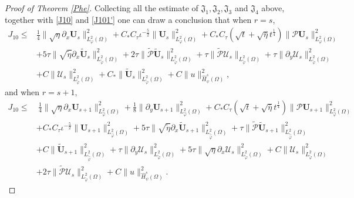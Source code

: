 \documentclass[10pt,a4paper]{amsart}
\begin{document}
\begin{proof}[Proof of Theorem \ref{Phe}]
Collecting all the estimate of $\mathfrak{J}_{1}, \mathfrak{J}_{2}, \mathfrak{J}_{3}$ and $\mathfrak{J}_{4}$ above, together with \eqref{J10} and \eqref{J101'} one can draw a conclusion that when $r=s$,
\begin{align*}
J_{10}
\leq& \frac{1}{4}\|\sqrt{\eta}\partial_{x}\mathbf{U}_{s}\|_{L_{\varphi}^{2}(\Omega)}^{2}
     +C_{*}C_{\tau}\iota^{-\frac{5}{2}}\|\mathbf{U}_{s}\|_{L_{\varphi}^{2}(\Omega)}^{2}
     +C_{*}C_{\tau}(\sqrt{t}+\sqrt{\bar{\eta}}t^{\frac{1}{4}})\|\mathcal{P}\mathbf{U}_{s}\|_{L_{\varphi}^{2}(\Omega)}^{2}\\
    &+5\tau\|\sqrt{\tilde{\eta}}\partial_{x}\tilde{\mathbf{U}}_{s}\|_{L_{\tilde{\varphi}}^{2}(\Omega)}^{2}
     +2\tau\|\tilde{\mathcal{P}}\tilde{\mathbf{U}}_{s}\|_{L_{\tilde{\varphi}}^{2}(\Omega)}^{2}
     +\tau\|\tilde{\mathcal{P}}\mathcal{U}_{s}\|_{L_{\tilde{\varphi}}^{2}(\Omega)}
     +\tau\|\partial_{y}\mathcal{U}_{s}\|_{L_{\tilde{\varphi}}^{2}(\Omega)}^{2}\\
    &+C\|\mathcal{U}_{s}\|_{L_{\tilde{\varphi}}^{2}(\Omega)}^{2}
     +C_{*}\|\tilde{\mathbf{U}}_{s}\|_{L_{\tilde{\varphi}}^{2}(\Omega)}^{2}
     +C\|u\|_{\hat{H}_{\psi}^{s}(\Omega)}^{2},
\end{align*}
and when $r=s+1$,
\begin{align*}
J_{10}
\leq&~\frac{1}{4}\|\sqrt{\eta}\partial_{x}\mathbf{U}_{s+1}\|_{L_{\hat{\varphi}}^{2}(\Omega)}^{2}
     +\frac{1}{8}\|\partial_{y}\mathbf{U}_{s+1}\|_{L_{\hat{\varphi}}^{2}(\Omega)}^{2}
     +C_{*}C_{\tau}(\sqrt{t}+\sqrt{\bar{\eta}}t^{\frac{1}{4}})\|\mathcal{P}\mathbf{U}_{s+1}\|_{L_{\hat{\varphi}}^{2}(\Omega)}^{2}\\
    &+C_{*}C_{\tau}\iota^{-\frac{5}{2}}\|\mathbf{U}_{s+1}\|_{L_{\hat{\varphi}}^{2}(\Omega)}^{2}
     +5\tau\|\sqrt{\tilde{\eta}}\partial_{x}\tilde{\mathbf{U}}_{s+1}\|_{L_{\tilde{\hat{\varphi}}}^{2}(\Omega)}^{2}
     +\tau\|\tilde{\mathcal{P}}\tilde{\mathbf{U}}_{s+1}\|_{L_{\tilde{\hat{\varphi}}}^{2}(\Omega)}^{2}\\
    &+C\|\tilde{\mathbf{U}}_{s+1}\|_{L_{\tilde{\hat{\varphi}}}^{2}(\Omega)}^{2}
     +\tau\|\partial_{y}\mathcal{U}_{s}\|_{L_{\tilde{\varphi}}^{2}(\Omega)}^{2}
     +5\tau\|\sqrt{\eta}\partial_{x}\mathcal{U}_{s}\|_{L_{\tilde{\varphi}}^{2}(\Omega)}^{2}
     +C\|\mathcal{U}_{s}\|_{L_{\tilde{\varphi}}^{2}(\Omega)}^{2}\\
    &+2\tau\|\tilde{\mathcal{P}}\mathcal{U}_{s}\|_{L_{\tilde{\varphi}}^{2}(\Omega)}^{2}
     +C\|u\|_{\hat{H}_{\psi}^{s}(\Omega)}^{2}.
\end{align*}


\end{proof}
\end{document}
